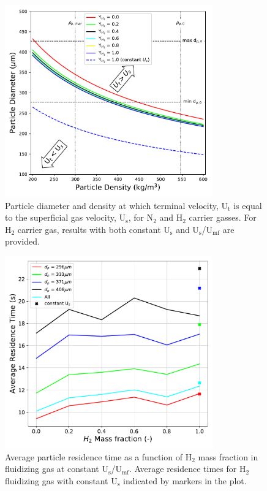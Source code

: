 \begin{figure}[H]
    \centering
    \includegraphics[width=0.8\textwidth]{figures/cfd-constuumf-terminal-vel.pdf}
    \caption{Particle diameter and density at which terminal velocity, U$_\text{t}$ is equal to the superficial gas velocity, U$_\text{s}$, for N$_2$ and H$_2$ carrier gasses. For H$_2$ carrier gas, results with both constant U$_\text{s}$ and U$_\text{s}$/U$_\text{mf}$ are provided.}
    \label{fig:cfd-constuumf-terminal-vel}
\end{figure}

\begin{figure}[H]
    \centering
    \includegraphics[width=0.8\textwidth]{figures/cfd-constuumf-rtd.pdf}
    \caption{Average particle residence time as a function of H$_2$ mass fraction in fluidizing gas at constant U$_\text{s}$/U$_\text{mf}$. Average residence times for H$_2$ fluidizing gas with constant U$_\text{s}$ indicated by markers in the plot.}
    \label{fig:cfd-constuumf-rtd}
\end{figure}

